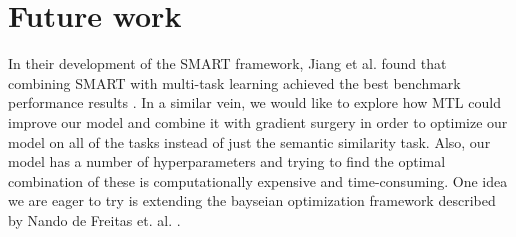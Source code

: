 \documentclass{article}
\begin{document}
\section{Future work}
    In their development of the SMART framework, Jiang et al. found that combining SMART with multi-task learning achieved the best benchmark performance results \cite{smart}. In a similar vein, we would like to explore how MTL could improve our model and combine it with gradient surgery in order to optimize our model on  all of the tasks instead of just the semantic similarity task. Also, our model has a number of hyperparameters and trying to find the optimal combination of these is computationally expensive and time-consuming. One idea we are eager to try is extending the bayseian optimization framework described by Nando de Freitas et. al. \cite{BayesianOpt}. 

\newpage


\end{document}
